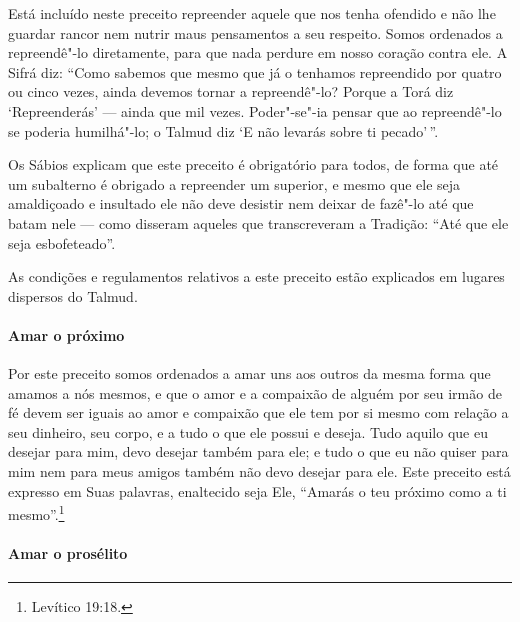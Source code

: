 \begin{multicols}{2}
Está incluído neste preceito repreender aquele que nos tenha ofendido e
não lhe guardar rancor nem nutrir maus pensamentos a seu respeito. Somos
ordenados a repreendê"-lo diretamente, para que nada perdure em nosso
coração contra ele. A Sifrá\starr{} diz: ``Como sabemos que mesmo que já o
tenhamos repreendido por quatro ou cinco vezes, ainda devemos tornar a
repreendê"-lo? Porque a Torá\starr{} diz `Repreenderás' --- ainda que mil vezes.
Poder"-se"-ia pensar que ao repreendê"-lo se poderia humilhá"-lo; o Talmud\starr{}
diz `E não levarás sobre ti pecado'\,''.

Os Sábios explicam que este preceito é obrigatório para todos, de forma
que até um subalterno é obrigado a repreender um superior, e mesmo que
ele seja amaldiçoado e insultado ele não deve desistir nem deixar de
fazê"-lo até que batam nele --- como disseram aqueles que transcreveram a
Tradição: ``Até que ele seja esbofeteado''.

As condições e regulamentos relativos a este preceito estão explicados
em lugares dispersos do Talmud\starr.

\paragraph{Amar o próximo}

Por este preceito somos ordenados a amar uns aos outros da mesma forma
que amamos a nós mesmos, e que o amor e a compaixão de alguém por seu
irmão de fé devem ser iguais ao amor e compaixão que ele tem por si
mesmo com relação a seu dinheiro, seu corpo, e a tudo o que ele possui e
deseja. Tudo aquilo que eu desejar para mim, devo desejar também para
ele; e tudo o que eu não quiser para mim nem para meus amigos também não
devo desejar para ele. Este preceito está expresso em Suas palavras,
enaltecido seja Ele, ``Amarás o teu próximo como a ti mesmo''.\footnote{Levítico
19:18.}

\paragraph{Amar o prosélito}


\end{multicols}
